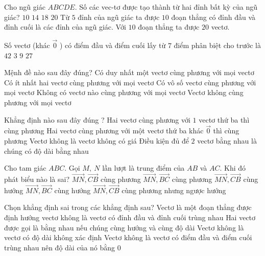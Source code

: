 \begin{ex}%
	Cho ngũ giác $ABCDE$. Số các vec-tơ được tạo thành từ hai đỉnh bất kỳ của ngũ giác?
	\choice
	{$10$}
	{$14$}
	{$18$}
	{\True $20$}
	\loigiai
	{Từ $5$ đỉnh của ngũ giác ta được $10$ đoạn thẳng có đỉnh đầu và đỉnh cuối là các đỉnh của ngũ giác. Với $10$ đoạn thẳng ta được $20$ vectơ. }
\end{ex}

\begin{ex}%
	Số vectơ (khác $\overrightarrow{0}$ ) có điểm đầu và điểm cuối lấy từ $7$ điểm phân biệt cho trước là
	\choice
	{\True $42$}
	{ $3$}
	{ $9$}
	{ $27$}
\end{ex}

\begin{ex}%
	Mệnh đề nào sau đây đúng?
	\choice
	{\True Có duy nhất một vectơ cùng phương với mọi vectơ}
	{Có ít nhất hai vectơ cùng phương với mọi vectơ}
	{Có vô số vectơ cùng phương với mọi vectơ}
	{Không có vectơ nào cùng phương với mọi vectơ}
	\loigiai
	{Vectơ không cùng phương với mọi vectơ}
\end{ex}


\begin{ex}%
	Khẳng định nào sau đây đúng ?
	\choice
	{Hai vectơ cùng phương với $1$ vectơ thứ ba thì cùng phương}
	{\True Hai vectơ cùng phương với một vectơ thứ ba khác $\overset{\to }0$ thì cùng phương}
	{Vectơ không là vectơ không có giá}
	{Điều kiện đủ để $2$ vectơ bằng nhau là chúng có độ dài bằng nhau}
\end{ex}


\begin{ex}%
	Cho tam giác $ABC$. Gọi $M,~N$ lần lượt là trung điểm của $AB$ và $AC$. Khi đó phát biểu nào là sai?
	\choice
	{$\overrightarrow{MN},\overrightarrow{CB}$ cùng phương}
	{$\overrightarrow{MN},\overrightarrow{BC}$ cùng phương}
	{\True $\overrightarrow{MN},\overrightarrow{CB}$ cùng hướng}
	{$\overrightarrow{MN},\overrightarrow{BC}$ cùng hướng}
	\loigiai
	{$\overrightarrow{MN},\overrightarrow{CB}$ cùng phương nhưng ngược hướng}
\end{ex}


\begin{ex}%
	Chọn khẳng định sai trong các khẳng định sau?
	\choice
	{Vectơ là một đoạn thẳng  được định hướng}
	{vectơ không là vectơ có đỉnh đầu và đỉnh cuối trùng nhau}
	{Hai vectơ được gọi là bằng nhau nếu chúng cùng hướng và cùng độ dài}
	{\True Vectơ không là vectơ có độ dài không xác định}
	\loigiai
	{Vectơ không là vectơ có điểm đầu và điểm cuối trùng nhau nên độ dài của nó bằng $0$}
\end{ex}


